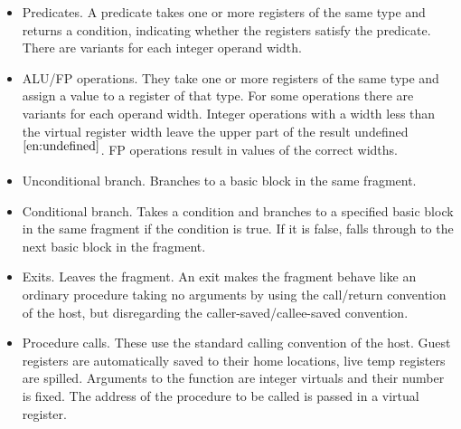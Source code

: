 \documentclass{article}
\newcommand{\enoteref}[1]{$^{\ref{#1}}$}
\begin{document}
\begin{itemize}
\item Predicates.  A predicate takes one or more registers of the same
    type and returns a condition, indicating whether the registers
    satisfy the predicate.  There are variants for each integer
    operand width.

\item ALU/FP operations.  They take one or more registers of the same
    type and assign a value to a register of that type.  For some
    operations there are variants for each
    operand width.  Integer operations with a width less than the
    virtual register width leave the upper part of the result
    undefined\enoteref{en:undefined}.  FP operations
    result in values of the correct widths.

\item Unconditional branch.  Branches to a basic block in the same
    fragment.

\item Conditional branch.  Takes a condition and branches to a specified
    basic block in the same fragment if the condition is true.  If it
    is false, falls through to the next basic block in the fragment.

\item Exits.  Leaves the fragment.  An exit makes the fragment behave
    like an ordinary procedure taking no arguments by using the
    call/return convention of the host, but disregarding the
    caller-saved/callee-saved convention.

\item Procedure calls.  These use the standard calling convention of the
    host.  Guest registers are automatically saved to their home
    locations, live temp registers are spilled.  Arguments to the
    function are integer virtuals and their number is fixed.  The address of the
    procedure to be called is passed in a virtual
    register.


\end{itemize}
\end{document}
